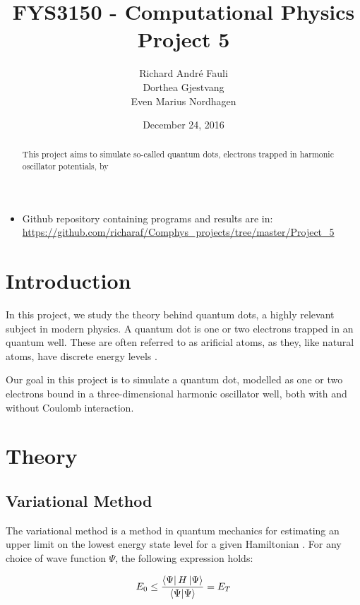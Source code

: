 \documentclass[norsk,a4paper,12pt]{article}
\title{FYS3150 - Computational Physics\\\vspace{2mm} \Large{Project 5}}
\author{\large Richard Andr\'e Fauli\\ Dorthea Gjestvang\\ Even Marius Nordhagen}
\date{December 24, 2016}
\begin{document}
\maketitle
\begin{abstract}
This project aims to simulate so-called quantum dots, electrons trapped in harmonic oscillator potentials, by
\end{abstract}


\begin{itemize}
\item Github repository containing programs and results are in: \url{https://github.com/richaraf/Comphys_projects/tree/master/Project_5}
\end{itemize}


\section{Introduction}
In this project, we study the theory behind quantum dots, a highly relevant subject in modern physics. A quantum dot is one or two electrons trapped in an quantum well. These are often referred to as arificial atoms, as they, like natural atoms, have discrete energy levels \cite{Nature}.

Our goal in this project is to simulate a quantum dot, modelled as one or two electrons bound in a three-dimensional harmonic oscillator well, both with and without Coulomb interaction.


\section{Theory}

\subsection{Variational Method} \label{VariationalMethod}
The variational method is a method in quantum mechanics for estimating an upper limit on the lowest energy state level for a given Hamiltonian \cite{Griffiths}. For any choice of wave function $\Psi$, the following expression holds:

\begin{equation}
    E_0 \leq \frac{\bra{\Psi} H \ket{\Psi}}{\bra{\Psi}\ket{\Psi}} = E_T
    \label{eq:VariationalMethod}
\end{equation}
\end{document}
